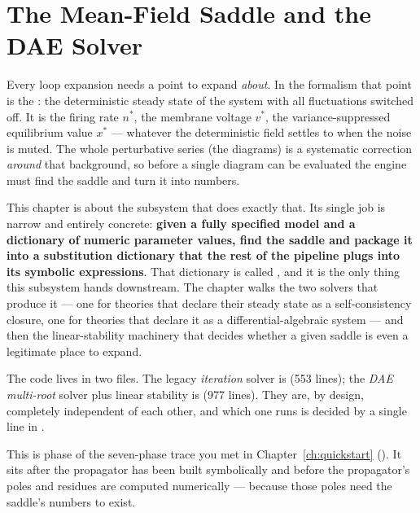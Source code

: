 \chapter{The Mean-Field Saddle and the DAE Solver}\label{ch:mean-field}

Every loop expansion needs a point to expand \emph{about}. In the \msrjd{}
formalism that point is the : the deterministic steady
state of the system with all fluctuations switched off. It is the firing rate
$n^{*}$, the membrane voltage $v^{*}$, the variance-suppressed equilibrium value
$x^{*}$ --- whatever the deterministic field settles to when the noise is muted.
The whole perturbative series (the diagrams) is a systematic correction
\emph{around} that background, so before a single diagram can be evaluated the
engine must find the saddle and turn it into numbers.

This chapter is about the subsystem that does exactly that. Its single job is
narrow and entirely concrete: \textbf{given a fully specified model and a
dictionary of numeric parameter values, find the saddle and package it into a
substitution dictionary that the rest of the pipeline plugs into its symbolic
expressions}. That dictionary is called , and it is the only
thing this subsystem hands downstream. The chapter walks the two solvers that
produce it --- one for theories that declare their steady state as a
self-consistency closure, one for theories that declare it as a
differential-algebraic system --- and then the linear-stability machinery that
decides whether a given saddle is even a legitimate place to expand.

The code lives in two files. The legacy \emph{iteration} solver is
 (553 lines); the \emph{DAE multi-root} solver
plus linear stability is  (977 lines). They
are, by design, completely independent of each other, and which one runs is
decided by a single line in .

This is phase \code{[3/7]} of the seven-phase trace you met in
Chapter~\ref{ch:quickstart} (). It sits
after the propagator has been built symbolically and before the propagator's
poles and residues are computed numerically --- because those poles need the
saddle's numbers to exist.

